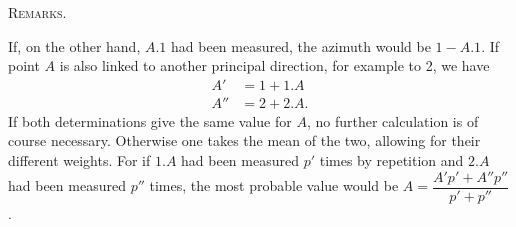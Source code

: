 \begingroup
\newcommand{\IXarc}[1]{\overset{\frown}{#1}}
\clearpage
{}\hfill\textsc{Remarks.}\hfill\mbox{}\par\medskip
\noindent If, on the other hand, $A.1$ had been measured, the azimuth would be $1-A.1$. If point $A$ is also linked to another principal direction, for example to 2, we have
\[
\begin{aligned}
A'&=1+1.A\\
A''&=2+2.A.
\end{aligned}
\]
If both determinations give the same value for $A$, no further calculation is of course necessary. Otherwise one takes the mean of the two, allowing for their different weights. For if $1.A$ had been measured $p'$ times by repetition and $2.A$ had been measured $p''$ times, the most probable value would be $A=\dfrac{A'p'+A''p''}{p'+p''}$.

